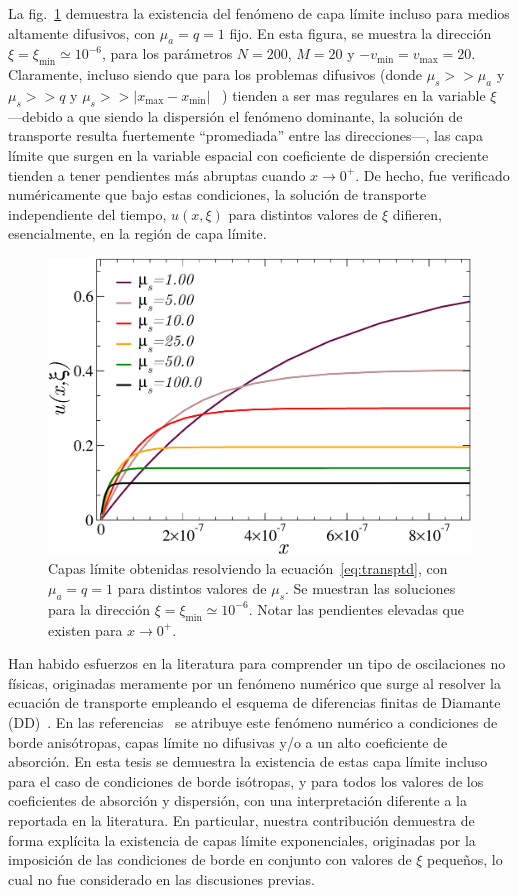 La fig.~\ref{fig:blayers} demuestra la existencia del fenómeno 
de capa límite incluso para medios altamente difusivos, con 
$\mu_a=q=1$ fijo. En esta figura, se muestra la dirección 
$\xi=\xi_{\text{min}}\simeq 10^{-6}$, para los parámetros 
$N=200$, $M=20$ y $-v_{\text{min}}=v_{\text{max}}=20$. 
Claramente, incluso siendo que para los problemas difusivos 
(donde $\mu_s>>\mu_a$ y $\mu_s>>q$ y $\mu_s>>|x_{\text{max}}-x_{\text{min}}|$~ 
\cite{Larsen1987}) tienden a ser mas regulares en la variable $\xi$ 
---debido a que siendo la dispersión el fenómeno dominante, 
la solución de transporte resulta fuertemente ``promediada'' entre las direcciones---, 
las capa límite que surgen en la variable espacial con coeficiente 
de dispersión creciente tienden a tener pendientes más abruptas 
cuando $x\to 0^+$. De hecho, fue verificado numéricamente que bajo estas condiciones, 
la solución de transporte independiente del tiempo, $u(x,\xi)$ 
para distintos valores de $\xi$ difieren, esencialmente, en la región 
de capa límite.
\begin{figure}[h!]
\centering
  \includegraphics[width=0.5\linewidth]{figuras/blayers.pdf}
  \caption{Capas límite obtenidas resolviendo la ecuación~\eqref{eq:transptd}, 
  con $\mu_a=q=1$ para distintos valores de $\mu_s$. 
  Se muestran las soluciones para la dirección $\xi=\xi_{\text{min}} \simeq 10^{-6}$. 
  Notar las pendientes elevadas que existen para $x\to 0^+$.}
 \label{fig:blayers}
\end{figure}
Han habido esfuerzos en la literatura para comprender un tipo 
de oscilaciones no físicas, originadas 
meramente por un fenómeno numérico que 
surge al resolver la ecuación de transporte 
empleando el esquema de diferencias finitas de Diamante (DD)~\cite{Larsen1987,Petrovic1996,Bal2001}.
En las referencias~\cite{Larsen1987,Petrovic1996} se atribuye 
este fenómeno numérico a condiciones de borde anisótropas, capas límite no difusivas y/o 
a un alto coeficiente de absorción. En esta tesis 
se demuestra la existencia de estas capa límite incluso para el 
caso de condiciones de borde isótropas, y para todos los valores 
de los coeficientes de absorción y dispersión, con una interpretación 
diferente a la reportada en la literatura. En particular, 
nuestra contribución demuestra de forma explícita la existencia 
de capas límite exponenciales, originadas por la imposición 
de las condiciones de borde en conjunto con valores de  $\xi$ 
pequeños, lo cual no fue considerado en las discusiones previas.

